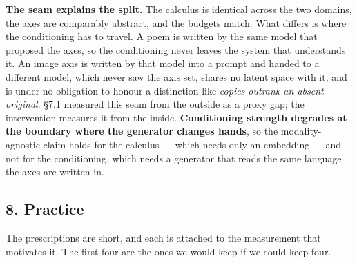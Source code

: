 \documentclass[
  10pt,
]{article}
\theoremstyle{plain}
\theoremstyle{definition}
\begin{document}
\textbf{The seam explains the split.} The calculus is identical across
the two domains, the axes are comparably abstract, and the budgets
match. What differs is where the conditioning has to travel. A poem is
written by the same model that proposed the axes, so the conditioning
never leaves the system that understands it. An image axis is written by
that model into a prompt and handed to a different model, which never
saw the axis set, shares no latent space with it, and is under no
obligation to honour a distinction like \emph{copies outrank an absent
original}. §7.1 measured this seam from the outside as a proxy gap; the
intervention measures it from the inside. \textbf{Conditioning strength
degrades at the boundary where the generator changes hands}, so the
modality-agnostic claim holds for the calculus --- which needs only an
embedding --- and not for the conditioning, which needs a generator that
reads the same language the axes are written in.

\subsection{8. Practice}\label{8-practice}

The prescriptions are short, and each is attached to the measurement
that motivates it. The first four are the ones we would keep if we could
keep four.
\end{document}
